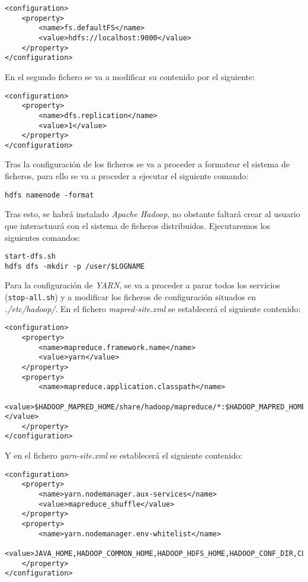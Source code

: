 \documentclass[11pt,a4paper]{article}
\begin{document}
\begin{lstlisting}
<configuration>
    <property>
        <name>fs.defaultFS</name>
        <value>hdfs://localhost:9000</value>
    </property>
</configuration>
\end{lstlisting}

En el segundo fichero se va a modificar su contenido por el siguiente:

\begin{lstlisting}
<configuration>
    <property>
        <name>dfs.replication</name>
        <value>1</value>
    </property>
</configuration>
\end{lstlisting}

Tras la configuración de los ficheros se va a proceder a formatear el sistema de ficheros, para ello se va a proceder a ejecutar el siguiente comando:

\begin{lstlisting}
hdfs namenode -format
\end{lstlisting}

Tras esto, se habrá instalado \emph{Apache Hadoop}, no obstante faltará crear al usuario que interactuará con el sistema de ficheros distribuidos. Ejecutaremos los siguientes comandos:

\begin{lstlisting}
start-dfs.sh
hdfs dfs -mkdir -p /user/$LOGNAME
\end{lstlisting}

Para la configuración de \emph{YARN}, se va a proceder a parar todos los servicios (\texttt{stop-all.sh}) y a modificar los ficheros de configuración situados en \emph{./etc/hadoop/}. En el fichero \emph{mapred-site.xml} se establecerá el siguiente contenido:

\begin{lstlisting}
<configuration>
    <property>
        <name>mapreduce.framework.name</name>
        <value>yarn</value>
    </property>
    <property>
        <name>mapreduce.application.classpath</name>
        <value>$HADOOP_MAPRED_HOME/share/hadoop/mapreduce/*:$HADOOP_MAPRED_HOME/share/hadoop/mapreduce/lib/*</value>
    </property>
</configuration>
\end{lstlisting}

Y en el fichero \emph{yarn-site.xml} se establecerá el siguiente contenido:

\begin{lstlisting}
<configuration>
    <property>
        <name>yarn.nodemanager.aux-services</name>
        <value>mapreduce_shuffle</value>
    </property>
    <property>
        <name>yarn.nodemanager.env-whitelist</name>
        <value>JAVA_HOME,HADOOP_COMMON_HOME,HADOOP_HDFS_HOME,HADOOP_CONF_DIR,CLASSPATH_PREPEND_DISTCACHE,HADOOP_YARN_HOME,HADOOP_MAPRED_HOME</value>
    </property>
</configuration>
\end{lstlisting}
\end{document}
